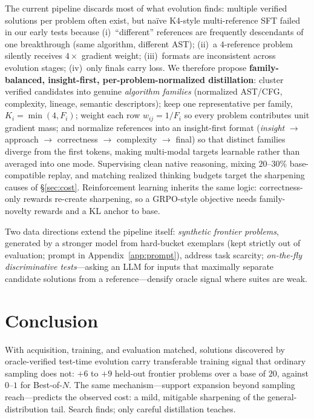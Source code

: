 \documentclass{article}
\begin{document}
The current pipeline discards most of what evolution finds: multiple verified solutions per problem often exist, but na\"ive K4-style multi-reference SFT failed in our early tests because (i)~``different'' references are frequently descendants of one breakthrough (same algorithm, different AST); (ii)~a $4$-reference problem silently receives $4\times$ gradient weight; (iii)~formats are inconsistent across evolution stages; (iv)~only finals carry loss. We therefore propose \textbf{family-balanced, insight-first, per-problem-normalized distillation}: cluster verified candidates into genuine \emph{algorithm families} (normalized AST/CFG, complexity, lineage, semantic descriptors); keep one representative per family, $K_i = \min(4, F_i)$; weight each row $w_{ij} = 1/F_i$ so every problem contributes unit gradient mass; and normalize references into an insight-first format (\emph{insight} $\to$ approach $\to$ correctness $\to$ complexity $\to$ final) so that distinct families diverge from the first tokens, making multi-modal targets learnable rather than averaged into one mode. Supervising clean native reasoning, mixing $20$--$30\%$ base-compatible replay, and matching realized thinking budgets target the sharpening causes of \S\ref{sec:cost}. Reinforcement learning inherits the same logic: correctness-only rewards re-create sharpening, so a GRPO-style objective \citep{shao2024deepseekmath} needs family-novelty rewards and a KL anchor to base.

Two data directions extend the pipeline itself: \emph{synthetic frontier problems}, generated by a stronger model from hard-bucket exemplars (kept strictly out of evaluation; prompt in Appendix~\ref{app:prompt}), address task scarcity; \emph{on-the-fly discriminative tests}---asking an LLM for inputs that maximally separate candidate solutions from a reference---densify oracle signal where suites are weak.

\section{Conclusion}

With acquisition, training, and evaluation matched, solutions discovered by oracle-verified test-time evolution carry transferable training signal that ordinary sampling does not: $+6$ to $+9$ held-out frontier problems over a base of $20$, against $0$--$1$ for Best-of-$N$. The same mechanism---support expansion beyond sampling reach---predicts the observed cost: a mild, mitigable sharpening of the general-distribution tail. Search finds; only careful distillation teaches.
\end{document}
